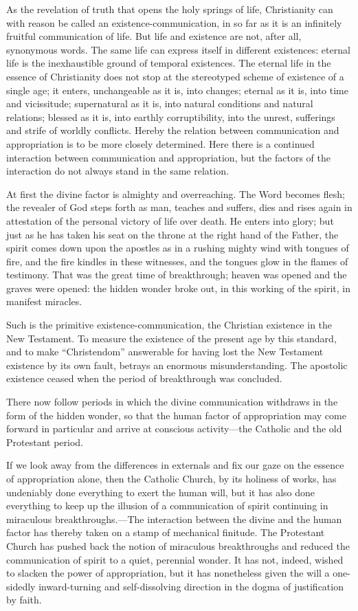 \documentclass[12pt,a4paper,openany]{book}
\newcommand{\opage}[1]{\marginnote{\footnotesize\textit{[#1]}}}
\begin{document}
As the revelation of truth that opens the holy springs of life,
Christianity can with reason be called an existence-communication, in so
far as it is an infinitely fruitful communication of life. But life and
existence are not, after all, synonymous words. The same life can express
itself in different existences: eternal life is the inexhaustible ground
of temporal existences. The eternal life in the essence of Christianity
does not stop at the stereotyped scheme of existence of a single age; it
\opage{78}enters, unchangeable as it is, into changes; eternal as it is, into time
and vicissitude; supernatural as it is, into natural conditions and
natural relations; blessed as it is, into earthly corruptibility, into
the unrest, sufferings and strife of worldly conflicts. Hereby the
relation between communication and appropriation is to be more closely
determined. Here there is a continued interaction between communication
and appropriation, but the factors of the interaction do not always
stand in the same relation.

At first the divine factor is almighty and overreaching. The Word becomes
flesh; the revealer of God steps forth as man, teaches and suffers, dies
and rises again in attestation of the personal victory of life over
death. He enters into glory; but just as he has taken his seat on the
throne at the right hand of the Father, the spirit comes down upon the
apostles as in a rushing mighty wind with tongues of fire, and the fire
kindles in these witnesses, and the tongues glow in the flames of
testimony. That was the great time of breakthrough; heaven was opened
and the graves were opened: the hidden wonder broke out, in this working
of the spirit, in manifest miracles.

Such is the primitive existence-communication, the Christian existence
in the New Testament. To measure the existence of the present age by
this standard, and to make ``Christendom'' answerable for having lost the
New Testament existence by its own fault, betrays an enormous
misunderstanding. The apostolic existence ceased when the period of
breakthrough was concluded.

There now follow periods in which the divine communication withdraws in
the form of the hidden \opage{79}wonder, so that the human factor of appropriation
may come forward in particular and arrive at conscious activity---the
Catholic and the old Protestant period.

If we look away from the differences in externals and fix our gaze on
the essence of appropriation alone, then the Catholic Church, by its
holiness of works, has undeniably done everything to exert the human
will, but it has also done everything to keep up the illusion of a
communication of spirit continuing in miraculous breakthroughs.---The
interaction between the divine and the human factor has thereby taken on
a stamp of mechanical finitude. The Protestant Church has pushed back the
notion of miraculous breakthroughs and reduced the communication of
spirit to a quiet, perennial wonder. It has not, indeed, wished to slacken
the power of appropriation, but it has nonetheless given the will a
one-sidedly inward-turning and self-dissolving direction in the dogma of
justification by faith.
\end{document}
